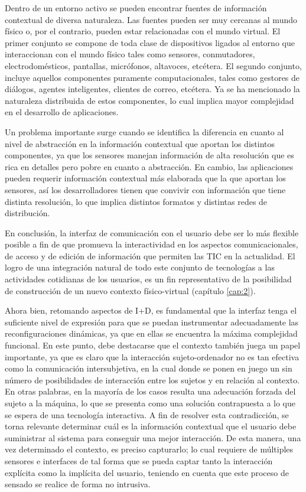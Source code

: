 Dentro de un entorno activo se pueden encontrar fuentes de información
contextual de diversa naturaleza. Las fuentes pueden ser muy cercanas al mundo
físico o, por el contrario, pueden estar relacionadas con el mundo virtual. El
primer conjunto se compone de toda clase de dispositivos ligados al entorno que
interaccionan con el mundo físico tales como sensores, conmutadores,
electrodomésticos, pantallas, micrófonos, altavoces, etcétera. El segundo conjunto, 
incluye aquellos componentes puramente computacionales, tales como gestores de
diálogos, agentes inteligentes, clientes de correo, etcétera. Ya se ha mencionado la
naturaleza distribuida de estos componentes, lo cual implica mayor complejidad
en el desarrollo de aplicaciones.

Un problema importante surge cuando se identifica la diferencia en cuanto al nivel de abstracción en la información contextual que aportan los distintos componentes, ya que los
sensores manejan información de alta resolución que es rica en detalles pero
pobre en cuanto a abstracción. En cambio, las aplicaciones pueden requerir
información contextual más elaborada que la que aportan los sensores, así los
desarrolladores tienen que convivir con información que tiene distinta
resolución, lo que implica distintos formatos y distintas redes de
distribución.

En conclusión, la interfaz de comunicación con el usuario debe ser lo más flexible
posible a fin de que promueva la interactividad en los aspectos
comunicacionales, de acceso y de edición de información que permiten las TIC en la actualidad. El logro de una integración natural de todo este conjunto de tecnologías a
las actividades cotidianas de los usuarios, es un fin representativo de la
posibilidad de construcción de un nuevo contexto físico-virtual (capítulo
\ref{cap:2}).

Ahora bien, retomando aspectos de I+D, es fundamental que la interfaz tenga el suficiente nivel de expresión para que se puedan instrumentar adecuadamente las reconfiguraciones
dinámicas, ya que en ellas se encuentra la máxima complejidad
funcional. En este punto, debe destacarse que el contexto también juega un papel importante, ya que es claro que la
interacción sujeto-ordenador no es tan efectiva como la comunicación
intersubjetiva, en la cual  donde se ponen en juego un sin número de posibilidades de
interacción entre los sujetos y en relación al contexto. En otras palabras, en la mayoría de los casos resulta una adecuación forzada del sujeto a la
máquina, lo que se presenta como una solución contrapuesta a lo que se espera de una tecnología interactiva. A fin de resolver esta contradicción, se torna relevante 
determinar cuál es la información contextual que el usuario debe suministrar al
sistema para conseguir una mejor interacción. De esta manera, una vez determinado el
contexto, es preciso capturarlo; lo cual requiere de múltiples sensores e
interfaces de tal forma que se pueda captar tanto la interacción explícita como
la implícita del usuario, teniendo en cuenta que este proceso de sensado se realice de
forma no intrusiva.  

